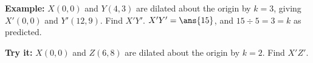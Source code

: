 \documentclass[12pt]{article}
\begin{document}
\begin{examplebox}
\textbf{Example:} $X(0,0)$ and $Y(4,3)$ are dilated about the origin by
$k = 3$, giving $X'(0,0)$ and $Y'(12,9)$. Find $X'Y'$.
$X'Y' = \ans{15}$, and $15 \div 5 = 3 = k$ as predicted.
\end{examplebox}

\begin{tryitbox}
\textbf{Try it:} $X(0,0)$ and $Z(6,8)$ are dilated about the origin by
$k = 2$. Find $X'Z'$.\\[2pt]
\end{tryitbox}
\end{document}
